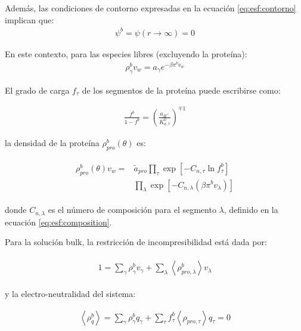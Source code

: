 Adem\'as, las condiciones de contorno expresadas en la ecuaci\'on \ref{eq:esf:contorno} implican que:
\begin{align}
	\psi^b = \psi(r \rightarrow \infty) = 0
\end{align}

En este contexto, para las especies libres (excluyendo la prote\'ina):
\begin{align}
	\rho_\gamma^b v_w = a_\gamma e^{-\beta\pi^bv_w}
	\label{eq:esf:free-bulk}
\end{align}

El grado de carga $f_\tau$ de los segmentos de la  prote\'ina  puede escribirse como:

\begin{align}
	\frac{f^b}{1-f^b} = \left(\frac{a_{H^+}}{K^0_{a,\tau}}\right)^{\mp 1}
\end{align}

la densidad de la prote\'ina $\rho_{pro}^b(\theta)$ es:

\begin{align}
	\begin{aligned}
		\rho^b_{pro}(\theta)v_w = &\tilde{a}_{pro} \prod_\tau\exp\left[-C_{n,\tau} \ln f^b_\tau\right] \\
		&\prod_\lambda \exp \left[-C_{n,\lambda} (\beta\pi^b v_\lambda ) \right]
	\end{aligned}
	\label{eq:esf:bulk-protein}
\end{align}

donde $C_{n,\lambda}$ es el n\'umero de composici\'on para el segmento $\lambda$, definido en la ecuaci\'on  \ref{eq:esf:composition}.

Para la soluci\'on bulk, la restricci\'on de incompresibilidad est\'a dada por:

\begin{align}
	\begin{aligned}
		1= {\sum_{\gamma}\rho^b_\gamma v_\gamma + \sum_\lambda{\left<\rho^b_{pro,\lambda}\right>v_\lambda} }
	\end{aligned}
	\label{eq:esf:bulk-constraint}
\end{align}


y la electro-neutralidad del sistema:

\begin{align}
	\left<\rho^b_q\right> = \sum_{\gamma } {\rho^b_\gamma q_\gamma + \sum_\tau{f^b_\tau \left<\rho_{pro,\tau}\right> q_\tau} =0}
	\label{eq:esf:rhobulk-charge}
\end{align}  

